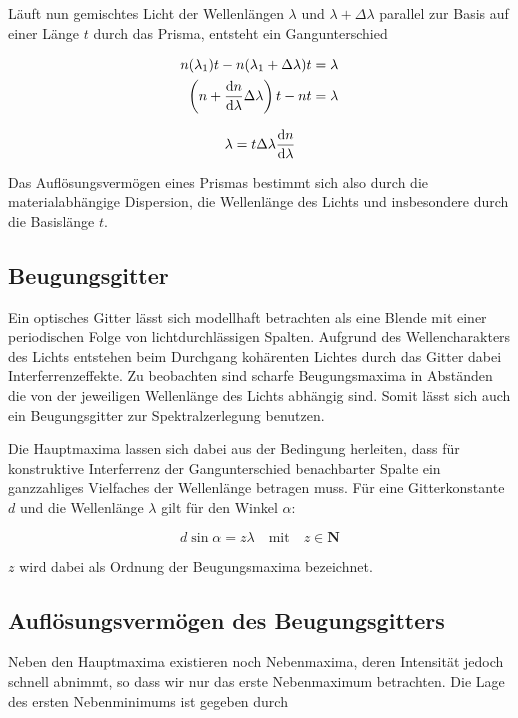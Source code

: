 \documentclass[a4paper,german,12pt,smallheadings]{scrartcl}
\begin{document}
Läuft nun gemischtes Licht der Wellenlängen $\lambda$ und $\lambda + \Delta
\lambda$ parallel zur Basis auf einer Länge $t$ durch das Prisma, entsteht ein
Gangunterschied

\begin{align}
  n(\lambda_1) t - n(\lambda_1 + \Delta \lambda) t &= \lambda \\
  \del{ n + \frac{\dif n}{\dif \lambda} \Delta \lambda}t - nt &= \lambda
\end{align}

\begin{equation}
  \lambda = t \Delta \lambda \frac{\dif n}{\dif \lambda}
\end{equation}

Das Auflösungsvermögen eines Prismas bestimmt sich also durch die
materialabhängige Dispersion, die Wellenlänge des Lichts und insbesondere durch
die Basislänge $t$.

\subsection{Beugungsgitter}

Ein optisches Gitter lässt sich modellhaft betrachten als eine Blende mit einer
periodischen Folge von lichtdurchlässigen Spalten. Aufgrund des
Wellencharakters des Lichts entstehen beim Durchgang kohärenten Lichtes durch
das Gitter dabei Interferrenzeffekte. Zu beobachten sind scharfe Beugungsmaxima
in Abständen die von der jeweiligen Wellenlänge des Lichts abhängig sind. Somit
lässt sich auch ein Beugungsgitter zur Spektralzerlegung benutzen.

Die Hauptmaxima lassen sich dabei aus der Bedingung herleiten, dass für
konstruktive Interferrenz der Gangunterschied benachbarter Spalte ein
ganzzahliges Vielfaches der Wellenlänge betragen muss. Für eine Gitterkonstante
$d$ und die Wellenlänge $\lambda$ gilt für den Winkel $\alpha$:

\begin{equation}
  d \sin \alpha = z \lambda \quad \text{mit} \quad z \in \mathbf{N}
\end{equation}

$z$ wird dabei als Ordnung der Beugungsmaxima bezeichnet.

\subsection{Auflösungsvermögen des Beugungsgitters}

Neben den Hauptmaxima existieren noch Nebenmaxima, deren Intensität jedoch
schnell abnimmt, so dass wir nur das erste Nebenmaximum betrachten. Die Lage
des ersten Nebenminimums ist gegeben durch
\end{document}

